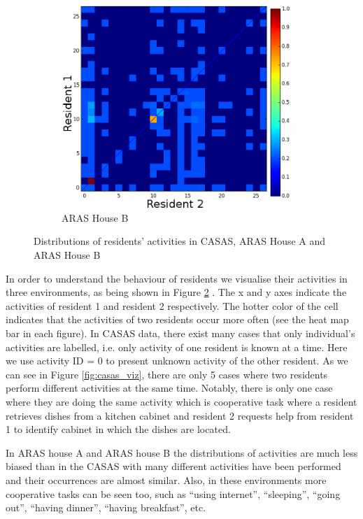 \begin{figure}[hpt]
    \begin{subfigure}{0.32\textwidth}
      \includegraphics[width=0.95\textwidth]{aras_b_acts_fusion.png}
      \caption{ARAS House B}
      \label{fig:aras_b_viz}
    \end{subfigure}
    \caption{Distributions of residents' activities in CASAS, ARAS House A and ARAS House B}
    \label{fig:act_viz}
\end{figure}

In order to understand the behaviour of residents we visualise their activities in three environments, as being shown in Figure \ref{fig:act_viz} .  The x and y axes indicate the activities of resident 1 and resident 2 respectively. The hotter color of the cell indicates that the activities of two residents occur more often (see
  the heat map bar in each figure). In CASAS data, there exist many cases that only individual's activities are labelled, i.e. only activity of one resident is known at a time. Here we use activity ID = 0 to present unknown activity of the other resident.  As we can see in Figure \ref{fig:casas_viz}, there are only 5 cases where two residents perform different activities at the same time. Notably, there is only one case where they are doing the same activity which is cooperative task where a resident retrieves dishes from a kitchen cabinet and resident 2 requests help from resident 1 to identify cabinet in which the dishes are located.

In ARAS house A and ARAS house B the distributions of activities are much less biased than in the CASAS with many different activities have been performed and their occurrences are almost similar. Also, in these environments more cooperative tasks can be seen too, such as ``using internet'', ``sleeping'', ``going out'', ``having dinner'', ``having breakfast'', etc.

